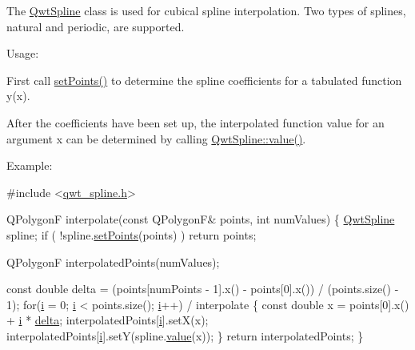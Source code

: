 The \hyperlink{class_qwt_spline}{Qwt\-Spline} class is used for cubical spline interpolation. Two types of splines, natural and periodic, are supported.

\begin{DoxyParagraph}{Usage\-:}

\begin{DoxyEnumerate}
\item First call \hyperlink{class_qwt_spline_a6ed13410b1d5f6b33ba0e3c2b07932cf}{set\-Points()} to determine the spline coefficients for a tabulated function y(x). 
\item After the coefficients have been set up, the interpolated function value for an argument x can be determined by calling \hyperlink{class_qwt_spline_a1f67187eefe2959f0c902532edf64d41}{Qwt\-Spline\-::value()}. 
\end{DoxyEnumerate}
\end{DoxyParagraph}
\begin{DoxyParagraph}{Example\-:}

\begin{DoxyCode}
\textcolor{preprocessor}{#include <\hyperlink{qwt__spline_8h}{qwt\_spline.h}>}

QPolygonF interpolate(\textcolor{keyword}{const} QPolygonF& points, \textcolor{keywordtype}{int} numValues)
\{
    \hyperlink{class_qwt_spline}{QwtSpline} spline;
    \textcolor{keywordflow}{if} ( !spline.\hyperlink{class_qwt_spline_a6ed13410b1d5f6b33ba0e3c2b07932cf}{setPoints}(points) )
        \textcolor{keywordflow}{return} points;

    QPolygonF interpolatedPoints(numValues);

    \textcolor{keyword}{const} \textcolor{keywordtype}{double} delta =
        (points[numPoints - 1].x() - points[0].x()) / (points.size() - 1);
    \textcolor{keywordflow}{for}(\hyperlink{analyze_i_n_s_g_p_s_8m_a6f6ccfcf58b31cb6412107d9d5281426}{i} = 0; \hyperlink{analyze_i_n_s_g_p_s_8m_a6f6ccfcf58b31cb6412107d9d5281426}{i} < points.size(); \hyperlink{analyze_i_n_s_g_p_s_8m_a6f6ccfcf58b31cb6412107d9d5281426}{i}++)  / interpolate
    \{
        \textcolor{keyword}{const} \textcolor{keywordtype}{double} x = points[0].x() + \hyperlink{analyze_i_n_s_g_p_s_8m_a6f6ccfcf58b31cb6412107d9d5281426}{i} * \hyperlink{_o_p_plots_8m_a66db7c5e4e9699c54207ab857ae72cb7}{delta};
        interpolatedPoints[\hyperlink{analyze_i_n_s_g_p_s_8m_a6f6ccfcf58b31cb6412107d9d5281426}{i}].setX(x);
        interpolatedPoints[\hyperlink{analyze_i_n_s_g_p_s_8m_a6f6ccfcf58b31cb6412107d9d5281426}{i}].setY(spline.\hyperlink{class_qwt_spline_a1f67187eefe2959f0c902532edf64d41}{value}(x));
    \}
    \textcolor{keywordflow}{return} interpolatedPoints;
\}
\end{DoxyCode}
 
\end{DoxyParagraph}


